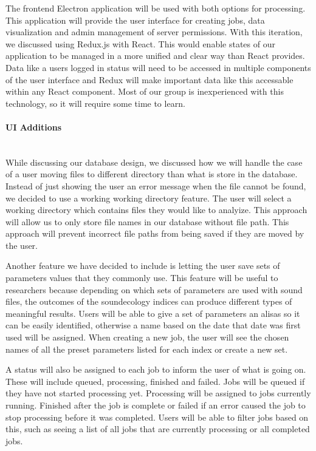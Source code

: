 The frontend Electron application will be used with both options for processing. This application will provide the user interface for creating jobs, data visualization and admin management of server permissions. With this iteration, we discussed using Redux.js with React. This would enable states of our application to be managed in a more unified and clear way than React provides. Data like a user\textquotesingle s logged in status will need to be accessed in multiple components of the user interface and Redux will make important data like this accessable within any React component. Most of our group is inexperienced with this technology, so it will require some time to learn.\par

\paragraph{UI Additions} \mbox{}\\[\paragraphheaderspace]
While discussing our database design, we discussed how we will handle the case of a user moving files to different directory than what is store in the database. Instead of just showing the user an error message when the file cannot be found, we decided to use a working working directory feature. The user will select a working directory which contains files they would like to analyize. This approach will allow us to only store file names in our database without file path. This approach will prevent incorrect file paths from being saved if they are moved by the user.\par
Another feature we have decided to include is letting the user save sets of parameters values that they commonly use. This feature will be useful to researchers because depending on which sets of parameters are used with sound files, the outcomes of the soundecology indices can produce different types of meaningful results. Users will be able to give a set of parameters an alisas so it can be easily identified, otherwise a name based on the date that date was first used will be assigned. When creating a new job, the user will see the chosen names of all the preset parameters listed for each index or create a new set.\par
A status will also be assigned to each job to inform the user of what is going on. These will include queued, processing, finished and failed. Jobs will be queued if they have not started processing yet. Processing will be assigned to jobs currently running. Finished after the job is complete or failed if an error caused the job to stop processing before it was completed. Users will be able to filter jobs based on this, such as seeing a list of all jobs that are currently processing or all completed jobs.\par

